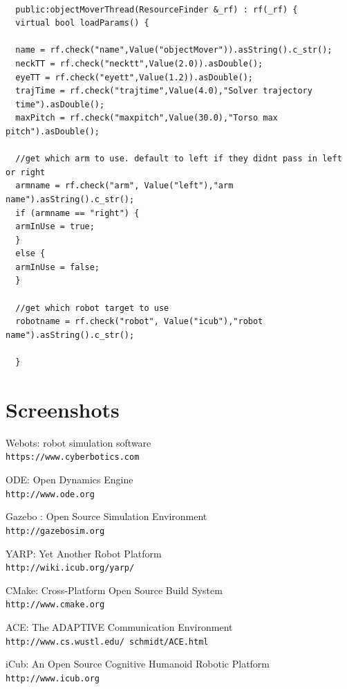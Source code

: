 \documentclass[a4paper, 12pt]{report}
\begin{document}
  
  \begin{lstlisting}
  
  public:objectMoverThread(ResourceFinder &_rf) : rf(_rf) {
  virtual bool loadParams() {
  
  name = rf.check("name",Value("objectMover")).asString().c_str();
  neckTT = rf.check("necktt",Value(2.0)).asDouble();
  eyeTT = rf.check("eyett",Value(1.2)).asDouble();
  trajTime = rf.check("trajtime",Value(4.0),"Solver trajectory 
  time").asDouble();
  maxPitch = rf.check("maxpitch",Value(30.0),"Torso max pitch").asDouble();
  
  //get which arm to use. default to left if they didnt pass in left or right
  armname = rf.check("arm", Value("left"),"arm name").asString().c_str();
  if (armname == "right") {
  armInUse = true;
  }
  else {
  armInUse = false;
  }
  
  //get which robot target to use
  robotname = rf.check("robot", Value("icub"),"robot name").asString().c_str();
  
  }
  \end{lstlisting}
  
  \appendix
  \chapter{Screenshots}
  
  \begin{thebibliography}{9}
    Webots: robot simulation software
    \\\texttt{https://www.cyberbotics.com}
    
    ODE: Open Dynamics Engine
    \\\texttt{http://www.ode.org}
    
    Gazebo : Open Source Simulation Environment
    \\\texttt{http://gazebosim.org}
    
    YARP: Yet Another Robot Platform 
    \\\texttt{http://wiki.icub.org/yarp/}
    
    CMake: Cross-Platform Open Source Build System 
    \\\texttt{http://www.cmake.org}
    
    ACE: The ADAPTIVE Communication Environment
    \\\texttt{http://www.cs.wustl.edu/~schmidt/ACE.html}
    
    iCub: An Open Source Cognitive Humanoid Robotic Platform
    \\\texttt{http://www.icub.org}
    
  \end{thebibliography}
  
\end{document}
